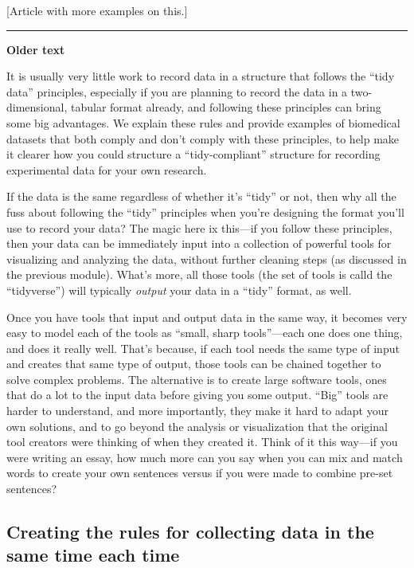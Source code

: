\documentclass[]{tufte-book}
\begin{document}
{[}Article with more examples on this.{]}

\begin{center}\rule{0.5\linewidth}{0.5pt}\end{center}

\textbf{Older text}

It is usually very little work to record data in a structure
that follows the ``tidy data'' principles, especially if you are planning to record
the data in a two-dimensional, tabular format already, and following these
principles can bring some big advantages. We explain these rules and provide
examples of biomedical datasets that both comply and don't comply with these
principles, to help make it clearer how you could structure a ``tidy-compliant''
structure for recording experimental data for your own research.

If the data is the same regardless of whether it's ``tidy'' or not, then why all
the fuss about following the ``tidy'' principles when you're designing the format
you'll use to record your data? The magic here ix this---if you follow these
principles, then your data can be immediately input into a collection of
powerful tools for visualizing and analyzing the data, without further cleaning
steps (as discussed in the previous module). What's more, all those tools (the
set of tools is calld the ``tidyverse'') will typically \emph{output} your data in a
``tidy'' format, as well.

Once you have tools that input and output data in the same way, it becomes very
easy to model each of the tools as ``small, sharp tools''---each one does one
thing, and does it really well. That's because, if each tool needs the same
type of input and creates that same type of output, those tools can be chained
together to solve complex problems. The alternative is to create large software
tools, ones that do a lot to the input data before giving you some output.
``Big'' tools are harder to understand, and more importantly, they make it hard
to adapt your own solutions, and to go beyond the analysis or visualization that
the original tool creators were thinking of when they created it. Think of it this
way---if you were writing an essay, how much more can you say when you can mix and
match words to create your own sentences versus if you were made to combine
pre-set sentences?

\hypertarget{creating-the-rules-for-collecting-data-in-the-same-time-each-time}{%
\subsection{Creating the rules for collecting data in the same time each time}\label{creating-the-rules-for-collecting-data-in-the-same-time-each-time}}
\end{document}
